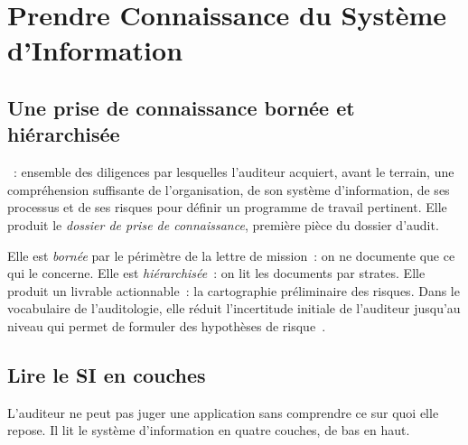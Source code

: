 \section{Prendre Connaissance du Système d'Information}
\label{sec:c08-connaissance}

\subsection{Une prise de connaissance bornée et hiérarchisée}

\begin{boxdef}
~: ensemble des
diligences par lesquelles l'auditeur acquiert, avant le terrain, une
compréhension suffisante de l'organisation, de son système d'information,
de ses processus et de ses risques pour définir un programme de travail
pertinent. Elle produit le \emph{dossier de prise de connaissance}, première
pièce du dossier d'audit.
\end{boxdef}

Elle est \emph{bornée} par le périmètre de la lettre de mission~: on ne
documente que ce qui le concerne. Elle est \emph{hiérarchisée}~: on lit les
documents par strates. Elle produit un livrable actionnable~: la
cartographie préliminaire des risques. Dans le vocabulaire de
l'auditologie, elle réduit l'incertitude initiale de l'auditeur jusqu'au
niveau qui permet de formuler des hypothèses de risque~\cite{minka2026auditologie}.

\subsection{Lire le SI en couches}

L'auditeur ne peut pas juger une application sans comprendre ce sur quoi
elle repose. Il lit le système d'information en quatre couches, de bas en
haut.

